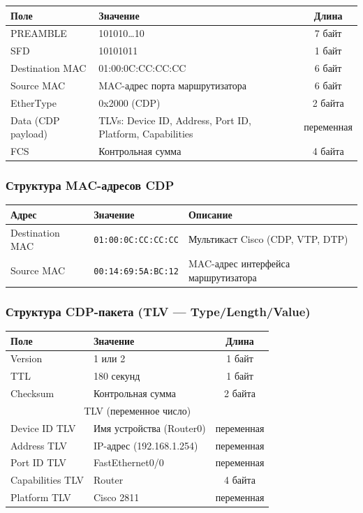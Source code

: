 \begin{enumerate}
\begin{center}
\begin{tabular}{|l|l|c|}
\hline
\textbf{Поле} & \textbf{Значение} & \textbf{Длина} \\
\hline
PREAMBLE & 101010…10 & 7 байт \\
SFD & 10101011 & 1 байт \\
Destination MAC & 01:00:0C:CC:CC:CC & 6 байт \\
Source MAC & MAC-адрес порта маршрутизатора & 6 байт \\
EtherType & 0x2000 (CDP) & 2 байта \\
Data (CDP payload) & TLVs: Device ID, Address, Port ID, Platform, Capabilities & переменная \\
FCS & Контрольная сумма & 4 байта \\
\hline
\end{tabular}
\end{center}

\subsubsection*{Структура MAC-адресов CDP}
\begin{center}
\begin{tabular}{|l|l|l|}
\hline
\textbf{Адрес} & \textbf{Значение} & \textbf{Описание} \\
\hline
Destination MAC & \texttt{01:00:0C:CC:CC:CC} & Мультикаст Cisco (CDP, VTP, DTP) \\
Source MAC & \texttt{00:14:69:5A:BC:12} & MAC-адрес интерфейса маршрутизатора \\
\hline
\end{tabular}
\end{center}

\subsubsection*{Структура CDP-пакета (TLV — Type/Length/Value)}
\begin{center}
\begin{tabular}{|l|l|c|}
\hline
\textbf{Поле} & \textbf{Значение} & \textbf{Длина} \\
\hline
Version & 1 или 2 & 1 байт \\
TTL & 180 секунд & 1 байт \\
Checksum & Контрольная сумма & 2 байта \\
\hline
\multicolumn{3}{|c|}{TLV (переменное число)} \\
\hline
Device ID TLV & Имя устройства (Router0) & переменная \\
Address TLV & IP-адрес (192.168.1.254) & переменная \\
Port ID TLV & FastEthernet0/0 & переменная \\
Capabilities TLV & Router & 4 байта \\
Platform TLV & Cisco 2811 & переменная \\
\hline
\end{tabular}
\end{center}


\end{enumerate}

